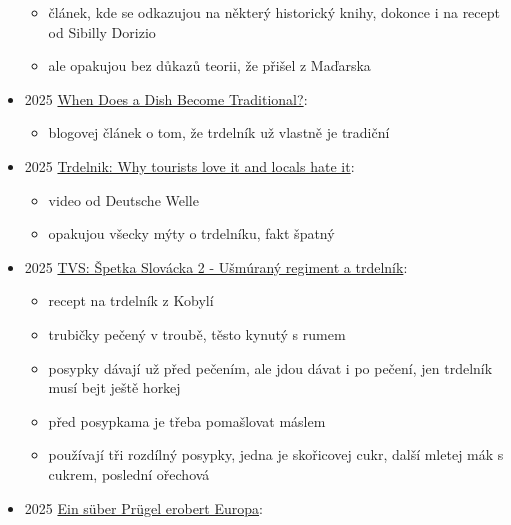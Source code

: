 \begin{itemize}
  \begin{itemize}
  \tightlist
  \item
    článek, kde se odkazujou na některý historický knihy, dokonce i na
    recept od Sibilly Dorizio
  \item
    ale opakujou bez důkazů teorii, že přišel z Maďarska
  \end{itemize}
\item
  2025
  \href{https://medium.com/rooted-publication/when-does-a-dish-become-traditional-740fc377bef5}{When
  Does a Dish Become Traditional?}:

  \begin{itemize}
  \tightlist
  \item
    blogovej článek o tom, že trdelník už vlastně je tradiční
  \end{itemize}
\item
  2025 \href{https://www.youtube.com/watch?v=qUezTWRfAMc}{Trdelnik: Why
  tourists love it and locals hate it}:

  \begin{itemize}
  \tightlist
  \item
    video od Deutsche Welle
  \item
    opakujou všecky mýty o trdelníku, fakt špatný
  \end{itemize}
\item
  2025 \href{https://www.youtube.com/watch?v=cw2WAJ3Pyvs}{TVS: Špetka
  Slovácka 2 - Ušmúraný regiment a trdelník}:

  \begin{itemize}
  \tightlist
  \item
    recept na trdelník z Kobylí
  \item
    trubičky pečený v troubě, těsto kynutý s rumem
  \item
    posypky dávají už před pečením, ale jdou dávat i po pečení, jen
    trdelník musí bejt ještě horkej
  \item
    před posypkama je třeba pomašlovat máslem
  \item
    používají tři rozdílný posypky, jedna je skořicovej cukr, další
    mletej mák s cukrem, poslední ořechová
  \end{itemize}
\item
  2025
  \href{https://www.pressreader.com/germany/sachsische-zeitung-rodertal/20250815/282089167858541}{Ein
  süber Prügel erobert Europa}:


\end{itemize}
